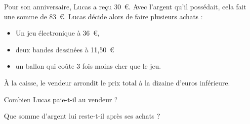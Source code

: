 Pour son anniversaire, Lucas a reçu 30~\textgreek{\euro}. Avec l'argent
qu'il possédait, cela fait une somme de 83~\textgreek{\euro}. Lucas
décide alors de faire plusieurs achats :
\begin{itemize}
\item Un jeu électronique à 36~\textgreek{\euro},
\item deux bandes dessinées à 11,50~\textgreek{\euro}
\item un ballon qui coûte 3 fois moins cher que le jeu.
\end{itemize}
\par \`A la caisse, le vendeur arrondit le prix total à la dizaine
d'euros inférieure.
\begin{myenumerate}
\item Combien Lucas paie-t-il au vendeur ?
\item Que somme d'argent lui reste-t-il après ses achats ?
\end{myenumerate}